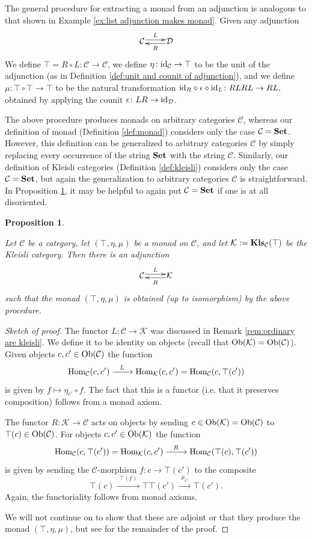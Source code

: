 \documentclass{book}
\makeatletter
\def\tn{\textnormal}
\def\mc{\mathcal}
\def\Hom{\tn{Hom}}
\def\Ob{\tn{Ob}}
\def\to{\rightarrow}
\def\taking{\colon}
\newcommand{\Too}[1]{\xrightarrow{\ \ #1\ \ }}
\newcommand{\Adjoint}[4]{\xymatrix@1{#2 \ar@<.5ex>[r]^-{#1} & #3 \ar@<.5ex>[l]^-{#4}}}
\def\id{\tn{id}}
\def\Kls{{\bf Kls}}
\def\Set{{\bf Set}}
\def\mcC{\mc{C}}
\def\mcD{\mc{D}}
\def\mcK{\mc{K}}
\newtheorem{proposition}[subsubsection]{Proposition}
\theoremstyle{remark}
\theoremstyle{definition}
\makeatother
\begin{document}
The general procedure for extracting a monad from an adjunction is analogous to that shown in Example \ref{ex:list adjunction makes monad}. Given any adjunction 
$$\Adjoint{L}{\mcC}{\mcD}{R}$$
We define $\top=R\circ L\taking\mcC\to\mcC$, we define $\eta\taking\id_\mcC\to \top$ to be the unit of the adjunction (as in Definition \ref{def:unit and counit of adjunction}), and we define $\mu\taking \top\circ \top\to \top$ to be the natural transformation $\id_R\diamond\epsilon\diamond\id_L\taking RLRL\to RL,$ obtained by applying the counit $\epsilon\taking LR\to\id_\mcD$.

The above procedure produces monads on arbitrary categories $\mcC$, whereas our definition of monad (Definition \ref{def:monad}) considers only the case $\mcC=\Set$. However, this definition can be generalized to arbitrary categories $\mcC$ by simply replacing every occurrence of the string $\Set$ with the string $\mcC$. Similarly, our definition of Kleisli categories (Definition \ref{def:kleisli}) considers only the case $\mcC=\Set$, but again the generalization to arbitrary categories $\mcC$ is straightforward. In Proposition \ref{prop:monad to adjunction}, it may be helpful to again put $\mcC=\Set$ if one is at all disoriented.

\begin{proposition}\label{prop:monad to adjunction}

Let $\mcC$ be a category, let $(\top,\eta,\mu)$ be a monad on $\mcC$, and let $\mcK:=\Kls_\mcC(\top)$ be the Kleisli category. Then there is an adjunction 
$$\Adjoint{L}{\mcC}{\mcK}{R}$$
such that the monad $(\top,\eta,\mu)$ is obtained (up to isomorphism) by the above procedure.

\end{proposition}

\begin{proof}[Sketch of proof]

The functor $L\taking\mcC\to\mcK$ was discussed in Remark \ref{rem:ordinary are kleisli}. We define it to be identity on objects (recall that $\Ob(\mcK)=\Ob(\mcC)$). Given objects $c,c'\in\Ob(\mcC)$ the function
$$\Hom_\mcC(c,c')\Too{L}\Hom_\mcK(c,c')=\Hom_\mcC(c,\top(c'))$$
is given by $f\mapsto \eta_{c'}\circ f$. The fact that this is a functor (i.e. that it preserves composition) follows from a monad axiom.

The functor $R\taking\mcK\to\mcC$ acts on objects by sending $c\in\Ob(\mcK)=\Ob(\mcC)$ to $\top(c)\in\Ob(\mcC)$. For objects $c,c'\in\Ob(\mcK)$ the function
$$\Hom_\mcC(c,\top(c'))=\Hom_\mcK(c,c')\Too{R}\Hom_\mcC(\top(c),\top(c'))$$
is given by sending the $\mcC$-morphism $f\taking c\to \top(c')$ to the composite 
$$\top(c)\Too{\top(f)}\top\top(c')\Too{\mu_{c'}}\top(c').$$
Again, the functoriality follows from monad axioms.

We will not continue on to show that these are adjoint or that they produce the monad $(\top,\eta,\mu)$, but see \cite[VI.5.1]{Mac} for the remainder of the proof.

\end{proof}
\end{document}
